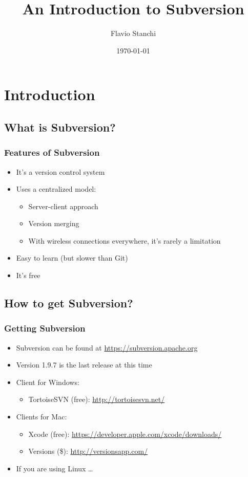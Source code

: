 \documentclass{beamer}
\title{An Introduction to Subversion}
\author{Flavio Stanchi}
\date{\today}
\begin{document}
\frame{\titlepage}

\section{Introduction}

\subsection{What is Subversion?}

\frame
{
  \frametitle{Features of Subversion}

  \begin{itemize}
  \item It's a version control system
  \item Uses a centralized model:
  	\begin{itemize}
  	\item Server-client approach
  	\item Version merging
	\item With wireless connections everywhere, it's rarely a limitation
  	\end{itemize}
  \item Easy to learn (but slower than Git)
  \item It's free
  \end{itemize}
}

\subsection{How to get Subversion?}

\frame
{
  \frametitle{Getting Subversion}
  
  \begin{itemize}
  \item<1-> Subversion can be found at \url{https://subversion.apache.org}
  \item<2-> Version 1.9.7 is the last release at this time
  \item<3-> Client for Windows:
  	\begin{itemize}
	\item<3-> TortoiseSVN (free): \url{http://tortoisesvn.net/}
	\end{itemize}
  \item<4-> Clients for Mac:
  	\begin{itemize}
	\item<4-> Xcode (free): \url{https://developer.apple.com/xcode/downloads/}
	\item<4-> Versions (\$): \url{http://versionsapp.com/}
	\end{itemize}
  \item<5-> If you are using Linux \dots 
  		 \uncover<6->{use the terminal!}
  \end{itemize}
}
\end{document}
